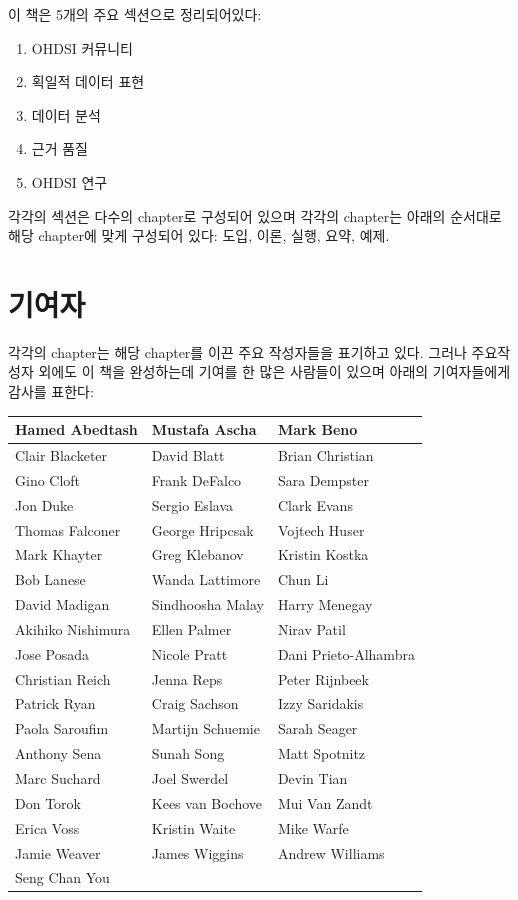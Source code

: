 \documentclass[11pt]{book}
\providecommand{\tightlist}{%
  \setlength{\itemsep}{0pt}\setlength{\parskip}{0pt}}
\theoremstyle{definition}
\theoremstyle{definition}
\theoremstyle{definition}
\theoremstyle{remark}
\begin{document}
이 책은 5개의 주요 섹션으로 정리되어있다:

\begin{enumerate}
\def\labelenumi{\Roman{enumi})}
\tightlist
\item
  OHDSI 커뮤니티
\item
  획일적 데이터 표현
\item
  데이터 분석
\item
  근거 품질
\item
  OHDSI 연구
\end{enumerate}

각각의 섹션은 다수의 chapter로 구성되어 있으며 각각의 chapter는 아래의
순서대로 해당 chapter에 맞게 구성되어 있다: 도입, 이론, 실행, 요약,
예제.

\section*{기여자}

각각의 chapter는 해당 chapter를 이끈 주요 작성자들을 표기하고 있다.
그러나 주요작성자 외에도 이 책을 완성하는데 기여를 한 많은 사람들이
있으며 아래의 기여자들에게 감사를 표한다:

\begin{tabular}{l|l|l}
\hline
Hamed Abedtash & Mustafa Ascha & Mark Beno\\
\hline
Clair Blacketer & David Blatt & Brian Christian\\
\hline
Gino Cloft & Frank DeFalco & Sara Dempster\\
\hline
Jon Duke & Sergio Eslava & Clark Evans\\
\hline
Thomas Falconer & George Hripcsak & Vojtech Huser\\
\hline
Mark Khayter & Greg Klebanov & Kristin Kostka\\
\hline
Bob Lanese & Wanda Lattimore & Chun Li\\
\hline
David Madigan & Sindhoosha Malay & Harry Menegay\\
\hline
Akihiko Nishimura & Ellen Palmer & Nirav Patil\\
\hline
Jose Posada & Nicole Pratt & Dani Prieto-Alhambra\\
\hline
Christian Reich & Jenna Reps & Peter Rijnbeek\\
\hline
Patrick Ryan & Craig Sachson & Izzy Saridakis\\
\hline
Paola Saroufim & Martijn Schuemie & Sarah Seager\\
\hline
Anthony Sena & Sunah Song & Matt Spotnitz\\
\hline
Marc Suchard & Joel Swerdel & Devin Tian\\
\hline
Don Torok & Kees van Bochove & Mui Van Zandt\\
\hline
Erica Voss & Kristin Waite & Mike Warfe\\
\hline
Jamie Weaver & James Wiggins & Andrew Williams\\
\hline
Seng Chan You &  & \\
\hline
\end{tabular}
\end{document}
